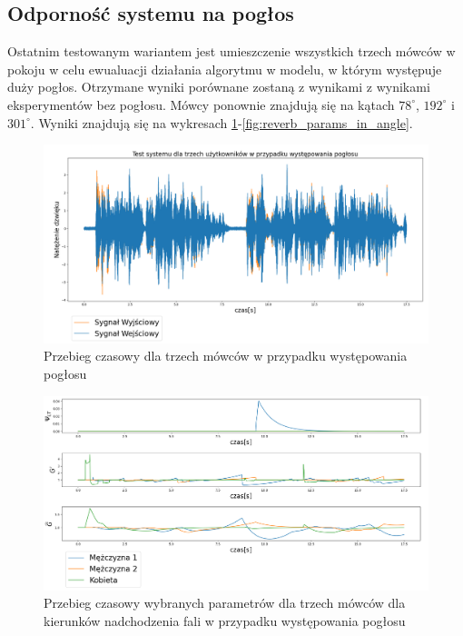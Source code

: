\subsection{Odporność systemu na pogłos}

Ostatnim testowanym wariantem jest umieszczenie wszystkich trzech mówców w pokoju w celu ewualuacji działania algorytmu w modelu, w którym występuje duży pogłos. Otrzymane wyniki porównane zostaną z wynikami z wynikami eksperymentów bez pogłosu. Mówcy ponownie znajdują się na kątach $78^{\circ}$, $192^{\circ}$ i $301^{\circ}$. Wyniki znajdują się na wykresach \ref{fig:reverb}-\ref{fig:reverb_params_in_angle}.

\begin{figure}[h!]
    \centering
    \includegraphics[width=\textwidth]{Images/reverb.png}
    \caption{Przebieg czasowy dla trzech mówców w przypadku występowania pogłosu}
    \label{fig:reverb}
\end{figure}

\begin{figure}[h!]
    \centering
    \includegraphics[width=\textwidth]{Images/reverb_params_in_time.png}
    \caption{Przebieg czasowy wybranych parametrów dla trzech mówców dla kierunków nadchodzenia fali w przypadku występowania pogłosu}
    \label{fig:reverb_params_in_time}
\end{figure}

